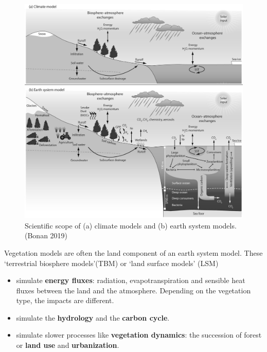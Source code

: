 \documentclass[12pt,oneside]{book}
\providecommand{\tightlist}{%
  \setlength{\itemsep}{0pt}\setlength{\parskip}{0pt}}
\begin{document}
\begin{figure}

{\centering \includegraphics[width=0.7\linewidth]{figures/chap1/GCM_ESM} 

}

\caption{Scientific scope of (a) climate models and (b) earth system models. (Bonan 2019)}\label{fig:f3}
\end{figure}

Vegetation models are often the land component of an earth system model.
These `terrestrial biosphere models'(TBM) or `land surface models' (LSM)

\begin{itemize}
\tightlist
\item
  simulate \textbf{energy fluxes}: radiation, evapotranspiration and
  sensible heat fluxes between the land and the atmosphere. Depending on
  the vegetation type, the impacts are different.
\item
  simulate the \textbf{hydrology} and the \textbf{carbon cycle}.
\item
  simulate slower processes like \textbf{vegetation dynamics}: the
  succession of forest or \textbf{land use} and \textbf{urbanization}.
\end{itemize}
\end{document}
